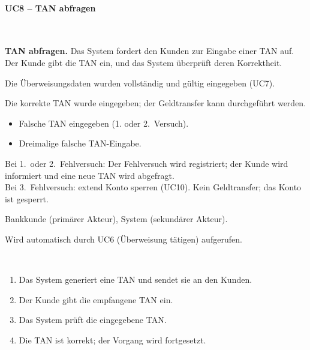 \documentclass[12pt]{scrartcl}
\newcommand{\umark}[1]{\guillemotleft #1\guillemotright}
\begin{document}
    \paragraph{UC8 -- TAN abfragen}~\\[4pt]
    \begin{description}[leftmargin=4.5cm, style=nextline, font=\normalfont\bfseries]
  \item[Name und Kurzbeschreibung:]
  \textbf{TAN abfragen.}
  Das System fordert den Kunden zur Eingabe einer TAN auf. Der Kunde gibt
  die TAN ein, und das System \"uberpr\"uft deren Korrektheit.

  \item[Vorbedingung:]
  Die \"Uberweisungsdaten wurden vollst\"andig und g\"ultig eingegeben (UC7).

  \item[Nachbedingung:]
  Die korrekte TAN wurde eingegeben; der Geldtransfer kann durchgef\"uhrt
  werden.

  \item[Fehlersituationen:]
  \begin{itemize}[nosep]
      \item Falsche TAN eingegeben (1. oder 2.\ Versuch).
      \item Dreimalige falsche TAN-Eingabe.
  \end{itemize}

  \item[Systemzustand im Fehlerfall:]
  Bei 1.\ oder 2.\ Fehlversuch: Der Fehlversuch wird registriert; der Kunde
  wird informiert und eine neue TAN wird abgefragt.\\
  Bei 3.\ Fehlversuch: \umark{extend} Konto sperren (UC10). Kein Geldtransfer;
  das Konto ist gesperrt.

  \item[Akteure:]
  Bankkunde (prim\"arer Akteur), System (sekund\"arer Akteur).

  \item[Trigger:]
  Wird automatisch durch UC6 (\"Uberweisung t\"atigen) aufgerufen.

  \item[Standardablauf:]~
  \begin{enumerate}
      \item Das System generiert eine TAN und sendet sie an den Kunden.
      \item Der Kunde gibt die empfangene TAN ein.
      \item Das System pr\"uft die eingegebene TAN.
      \item Die TAN ist korrekt; der Vorgang wird fortgesetzt.
  \end{enumerate}


\end{description}
\end{document}
